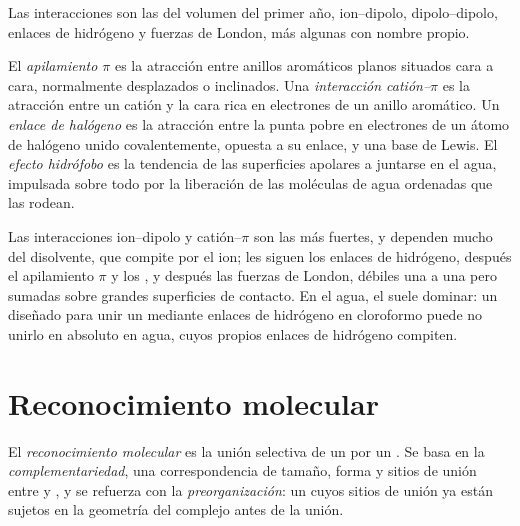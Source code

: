 Las interacciones son las del volumen del primer año, ion--dipolo, dipolo--dipolo,
enlaces de hidrógeno y fuerzas de London, más algunas con nombre propio.

\begin{definition}\label{def:b3:supramolecular:interactions}
El \emph{apilamiento $\pi$} es la atracción entre anillos
aromáticos planos situados cara a cara, normalmente desplazados o inclinados. Una \emph{interacción
catión--$\pi$} es la atracción entre un catión y
la cara rica en electrones de un anillo aromático. Un \emph{enlace de halógeno}
es la atracción entre la punta pobre en electrones de un átomo de halógeno unido covalentemente,
opuesta a su enlace, y una base de Lewis. El \emph{efecto
hidrófobo} es la tendencia de las superficies apolares a
juntarse en el agua, impulsada sobre todo por la liberación de las moléculas de agua ordenadas
que las rodean.
\end{definition}

Las interacciones ion--dipolo y catión--$\pi$ son las más fuertes, y dependen
mucho del disolvente, que compite por el ion; les siguen los enlaces de hidrógeno,
después el apilamiento $\pi$ y los , y después las fuerzas de London, débiles una a una pero
sumadas sobre grandes superficies de contacto. En el agua, el  suele
dominar: un  diseñado para unir un  mediante enlaces de hidrógeno en cloroformo puede no
unirlo en absoluto en agua, cuyos propios enlaces de hidrógeno compiten.

\section{Reconocimiento molecular}

\begin{definition}\label{def:b3:supramolecular:recognition}
El \emph{reconocimiento molecular} es la unión
selectiva de un  por un . Se basa en la \emph{complementariedad},
una correspondencia de tamaño, forma y sitios de unión entre  y , y se
refuerza con la \emph{preorganización}: un  cuyos
sitios de unión ya están sujetos en la geometría del complejo antes de la unión.
\end{definition}

